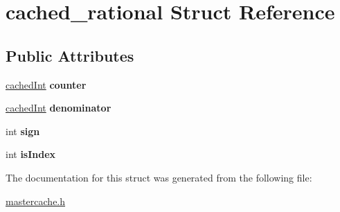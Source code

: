 \hypertarget{structcached__rational}{}\section{cached\+\_\+rational Struct Reference}
\label{structcached__rational}
\subsection*{Public Attributes}
\begin{DoxyCompactItemize}
\item 
\hyperlink{mastercache_8h_a113c03970467afb459ed5ae157d0a870}{cached\+Int} {\bfseries counter}\hypertarget{structcached__rational_a56efc85eb1eb036006209a55185e7c48}{}\label{structcached__rational_a56efc85eb1eb036006209a55185e7c48}

\item 
\hyperlink{mastercache_8h_a113c03970467afb459ed5ae157d0a870}{cached\+Int} {\bfseries denominator}\hypertarget{structcached__rational_a0ffb63bf4617a16cf668c82341d05ba3}{}\label{structcached__rational_a0ffb63bf4617a16cf668c82341d05ba3}

\item 
int {\bfseries sign}\hypertarget{structcached__rational_a7d5c4be13edb4993207743607ece8731}{}\label{structcached__rational_a7d5c4be13edb4993207743607ece8731}

\item 
int {\bfseries is\+Index}\hypertarget{structcached__rational_a5f5d24f84ca89ca08d2040c031fabe74}{}\label{structcached__rational_a5f5d24f84ca89ca08d2040c031fabe74}

\end{DoxyCompactItemize}


The documentation for this struct was generated from the following file\+:\begin{DoxyCompactItemize}
\item 
\hyperlink{mastercache_8h}{mastercache.\+h}\end{DoxyCompactItemize}
